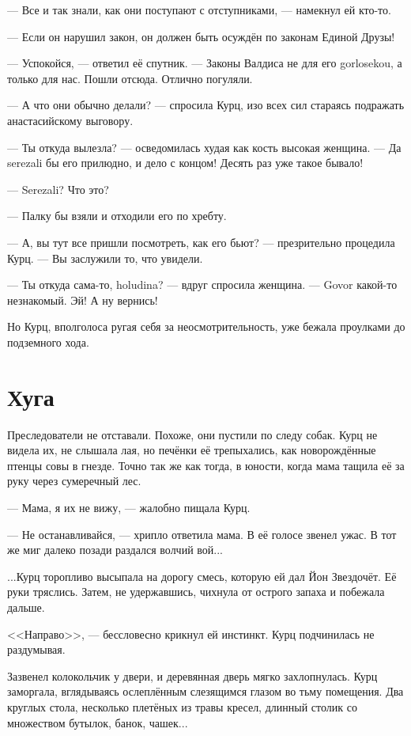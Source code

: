 --- Все и так знали, как они поступают с отступниками, --- намекнул ей кто-то.

--- Если он нарушил закон, он должен быть осуждён по законам Единой Друзы!

--- Успокойся, --- ответил её спутник.
--- Законы Валдиса не для его gorlosekou, а только для нас.
Пошли отсюда.
Отлично погуляли.

--- А что они обычно делали? --- спросила Курц, изо всех сил стараясь подражать анастасийскому выговору.

--- Ты откуда вылезла? --- осведомилась худая как кость высокая женщина.
--- Да serezali бы его прилюдно, и дело с концом!
Десять раз уже такое бывало!

--- Serezali?
Что это?

--- Палку бы взяли и отходили его по хребту.

--- А, вы тут все пришли посмотреть, как его бьют? --- презрительно процедила Курц.
--- Вы заслужили то, что увидели.

--- Ты откуда сама-то, holudina? --- вдруг спросила женщина.
--- Govor какой-то незнакомый.
Эй!
А ну вернись!

Но Курц, вполголоса ругая себя за неосмотрительность, уже бежала проулками до подземного хода.

\section{Хуга}

Преследователи не отставали.
Похоже, они пустили по следу собак.
Курц не видела их, не слышала лая, но печёнки её трепыхались, как новорождённые птенцы совы в гнезде.
Точно так же как тогда, в юности, когда мама тащила её за руку через сумеречный лес.

--- Мама, я их не вижу, --- жалобно пищала Курц.

--- Не останавливайся, --- хрипло ответила мама.
В её голосе звенел ужас.
В тот же миг далеко позади раздался волчий вой...

...Курц торопливо высыпала на дорогу смесь, которую ей дал Йон Звездочёт.
Её руки тряслись.
Затем, не удержавшись, чихнула от острого запаха и побежала дальше.

<<Направо>>, --- бессловесно крикнул ей инстинкт.
Курц подчинилась не раздумывая.

Зазвенел колокольчик у двери, и деревянная дверь мягко захлопнулась.
Курц заморгала, вглядываясь ослеплённым слезящимся глазом во тьму помещения.
Два круглых стола, несколько плетёных из травы кресел, длинный столик со множеством бутылок, банок, чашек...

